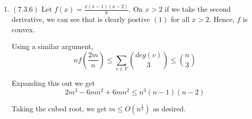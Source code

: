 \documentclass[12pt]{article}
\begin{document}
\begin{enumerate}[start=1,label={\bfseries Problem \arabic*:},leftmargin=1in]
    \item $(7.3.6)$ Let $f(x) = \frac{x(x-1)(x-2)}{6}$. On $x>2$ if we take the second derivative, we can see that is clearly postive $(1)$ for all $x > 2$. 
    Hence, $f$ is convex. 

    Using a similar argument, 
\[ nf(\frac{2m}{n}) \leq \sum_{v \in V} \binom{deg(v)}{3} \leq \binom{n}{3}\] 

    Expanding this out we get 
    \[ 
        2m^{3} - 6mn^{2} + 6mn^{2} \leq n^{3}(n-1)(n-2)
    \]

    Taking the cubed root, we get $m \leq O(n^{\frac{5}{3}})$ as desired. 
\end{enumerate} 
\end{document}
